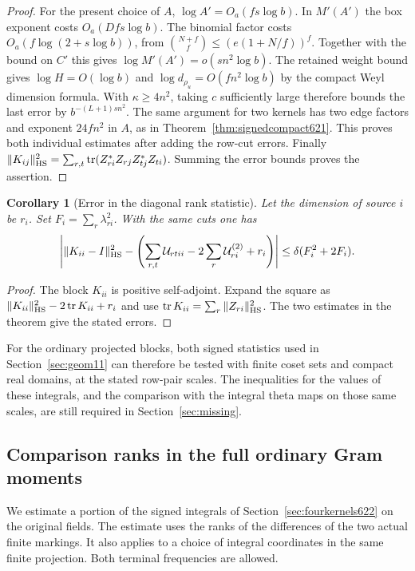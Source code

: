 \documentclass[a4paper,11pt]{article}
\newtheorem{corollary}[proposition]{Corollary}
\theoremstyle{definition}
\theoremstyle{remark}
\numberwithin{equation}{section}
\begin{document}
\begin{proof}
For the present choice of \(A\), \(\log A'=O_a(fs\log b)\).
In \(M'(A')\) the box exponent costs \(O_a(Dfs\log b)\).
The binomial factor costs \(O_a(f\log(2+s\log b))\),
from \(\binom{N+f}{f}\le(e(1+N/f))^f\).
Together with the bound on \(C'\) this gives
\(\log M'(A')=o(sn^2\log b)\).
The retained weight bound gives \(\log H=O(\log b)\) and
\(\log d_{\rho_u}=O(fn^2\log b)\) by the compact Weyl
dimension formula. With \(\kappa\ge4n^2\), taking \(c\)
sufficiently large therefore bounds the last error by
\(b^{-(L+1)sn^2}\). The same argument for two kernels has
two edge factors and exponent \(24fn^2\) in \(A\), as in
Theorem~\ref{thm:signedcompact621}. This proves both
individual estimates after adding the row-cut errors.
Finally
\(\|K_{ij}\|_{\rm HS}^2
 =\sum_{r,t}\operatorname{tr}(Z_{ri}^*Z_{rj}Z_{tj}^*Z_{ti})\).
Summing the error bounds proves the assertion.
\end{proof}

\begin{corollary}[Error in the diagonal rank statistic]
\leavevmode\label{cor:gramerror622}
Let the dimension of source \(i\) be \(r_i\).
Set \(F_i=\sum_r\lambda_{ri}^2\). With the same cuts one has
\[
 \left|\|K_{ii}-I\|_{\rm HS}^2-
  \left(\sum_{r,t}\mathcal U_{rtii}
           -2\sum_r\mathcal U_{ri}^{(2)}+r_i\right)\right|
     \le\delta(F_i^2+2F_i).
\]
\end{corollary}
\begin{proof}
The block \(K_{ii}\) is positive self-adjoint. Expand the square
as \(\|K_{ii}\|_{\rm HS}^2-2\operatorname{tr}K_{ii}+r_i\)
and use \(\operatorname{tr}K_{ii}=\sum_r\|Z_{ri}\|_{\rm HS}^2\).
The two estimates in the theorem give the stated errors.
\end{proof}

For the ordinary projected blocks, both signed statistics used
in Section~\ref{sec:geom11} can therefore be tested with finite
coset sets and compact real domains, at the stated row-pair
scales. The inequalities for the values of these integrals,
and the comparison with the integral theta maps on those same
scales, are still required in Section~\ref{sec:missing}.


\subsection{Comparison ranks in the full ordinary Gram moments}
\label{sec:markedranks623}

We estimate a portion of the signed integrals of
Section~\ref{sec:fourkernels622} on the original fields. The estimate
uses the ranks of the differences of the two actual finite markings.
It also applies to a choice of integral coordinates in the same finite
projection. Both terminal frequencies are allowed.
\end{document}
